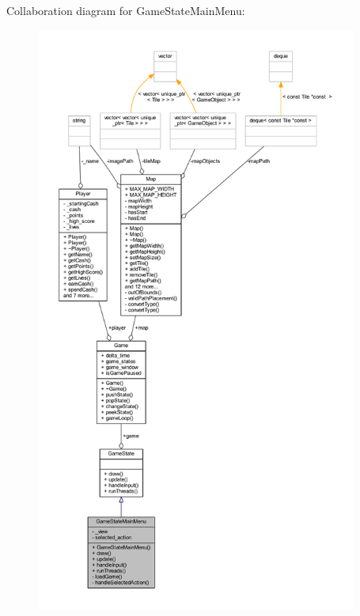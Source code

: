Collaboration diagram for Game\+State\+Main\+Menu\+:\nopagebreak
\begin{figure}[H]
\begin{center}
\leavevmode
\includegraphics[height=550pt]{class_game_state_main_menu__coll__graph}
\end{center}
\end{figure}

